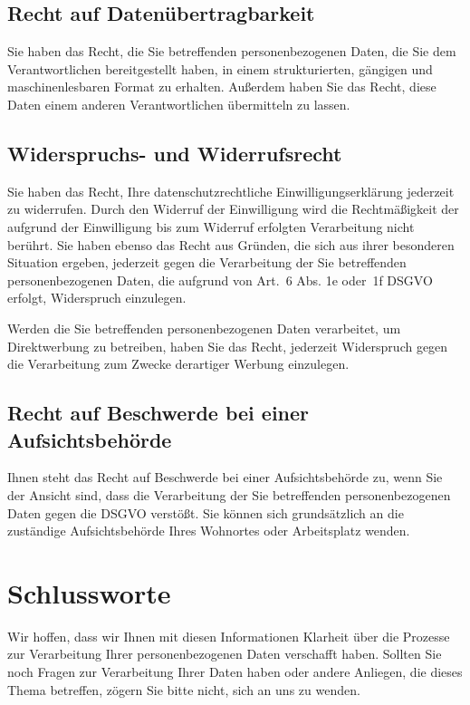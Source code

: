 \documentclass[a4paper, 10pt, headings=normal]{scrartcl}
\begin{document}
\begin{multicols*}{2}
\subsection{Recht auf Datenübertragbarkeit}

Sie haben das Recht, die Sie betreffenden personenbezogenen Daten, die Sie dem Verantwortlichen bereitgestellt haben, in einem strukturierten, gängigen und maschinenlesbaren Format zu erhalten.
Außerdem haben Sie das Recht, diese Daten einem anderen Verantwortlichen übermitteln zu lassen.

\subsection{Widerspruchs- und Widerrufsrecht}

Sie haben das Recht, Ihre datenschutzrechtliche Einwilligungserklärung jederzeit zu widerrufen.
Durch den Widerruf der Einwilligung wird die Rechtmäßigkeit der aufgrund der Einwilligung bis zum Widerruf erfolgten Verarbeitung nicht berührt.
Sie haben ebenso das Recht aus Gründen, die sich aus ihrer besonderen Situation ergeben, jederzeit gegen die Verarbeitung der Sie betreffenden personenbezogenen Daten, die aufgrund von Art.~6 Abs. 1e oder~1f DSGVO erfolgt, Widerspruch einzulegen.

Werden die Sie betreffenden personenbezogenen Daten verarbeitet, um Direktwerbung zu betreiben, haben Sie das Recht, jederzeit Widerspruch gegen die Verarbeitung zum Zwecke derartiger Werbung einzulegen.

\subsection{Recht auf Beschwerde bei einer Aufsichtsbehörde}

Ihnen steht das Recht auf Beschwerde bei einer Aufsichtsbehörde zu, wenn Sie der Ansicht sind, dass die Verarbeitung der Sie betreffenden personenbezogenen Daten gegen die DSGVO verstößt.
Sie können sich grundsätzlich an die zuständige Aufsichtsbehörde Ihres Wohnortes oder Arbeitsplatz wenden.

\section{Schlussworte}

Wir hoffen, dass wir Ihnen mit diesen Informationen Klarheit über die Prozesse zur Verarbeitung Ihrer personenbezogenen Daten verschafft haben.
Sollten Sie noch Fragen zur Verarbeitung Ihrer Daten haben oder andere Anliegen, die dieses Thema betreffen, zögern Sie bitte nicht, sich an uns zu wenden.


\end{multicols*}
\end{document}
